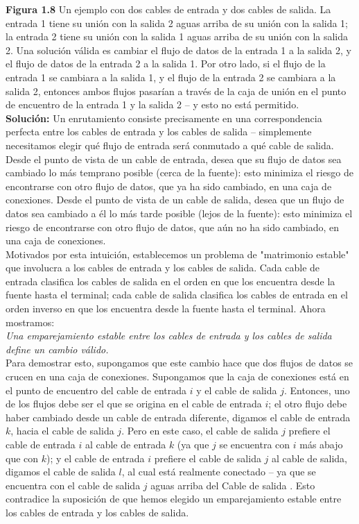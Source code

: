 \documentclass{article}
\begin{document}
\textbf{Figura 1.8} Un ejemplo con dos cables de entrada y dos cables de salida. La entrada 1 tiene su unión con la salida 2 aguas arriba de su unión con la salida 1; la entrada 2 tiene su unión con la salida 1 aguas arriba de su unión con la salida 2. Una solución válida es cambiar el flujo de datos de la entrada 1 a la salida 2, y el flujo de datos de la entrada 2 a la salida 1. Por otro lado, si el flujo de la entrada 1 se cambiara a la salida 1, y el flujo de la entrada 2 se cambiara a la salida 2, entonces ambos flujos pasarían a través de la caja de unión en el punto de encuentro de la entrada 1 y la salida 2 -- y esto no está permitido.\\

\textbf{Solución:} Un enrutamiento consiste precisamente en una correspondencia perfecta entre los cables de entrada y los cables de salida -- simplemente necesitamos elegir qué flujo de entrada será conmutado a qué cable de salida.\\

Desde el punto de vista de un cable de entrada, desea que su flujo de datos sea cambiado lo más temprano posible (cerca de la fuente): esto minimiza el riesgo de encontrarse con otro flujo de datos, que ya ha sido cambiado, en una caja de conexiones. Desde el punto de vista de un cable de salida, desea que un flujo de datos sea cambiado a él lo más tarde posible (lejos de la fuente): esto minimiza el riesgo de encontrarse con otro flujo de datos, que aún no ha sido cambiado, en una caja de conexiones.\\

Motivados por esta intuición, establecemos un problema de "matrimonio estable" que involucra a los cables de entrada y los cables de salida. Cada cable de entrada clasifica los cables de salida en el orden en que los encuentra desde la fuente hasta el terminal; cada cable de salida clasifica los cables de entrada en el orden inverso en que los encuentra desde la fuente hasta el terminal. Ahora mostramos:\\

\textit{Una emparejamiento estable entre los cables de entrada y los cables de salida define un cambio válido.} \\

Para demostrar esto, supongamos que este cambio hace que dos flujos de datos se crucen en una caja de conexiones. Supongamos que la caja de conexiones está en el punto de encuentro del cable de entrada $i$ y el cable de salida $j$. Entonces, uno de los flujos debe ser el que se origina en el cable de entrada $i$; el otro flujo debe haber cambiado desde un cable de entrada diferente, digamos el cable de entrada $k$, hacia el cable de salida $j$. Pero en este caso, el cable de salida $j$ prefiere el cable de entrada $i$ al cable de entrada $k$ (ya que $j$ se encuentra con $i$ más abajo que con $k$); y el cable de entrada $i$ prefiere el cable de salida $j$ al cable de salida, digamos el cable de salida $l$, al cual está realmente conectado -- ya que se encuentra con el cable de salida $j$ aguas arriba del Cable de salida . Esto contradice la suposición de que hemos elegido un emparejamiento estable entre los cables de entrada y los cables de salida.\\
\end{document}
